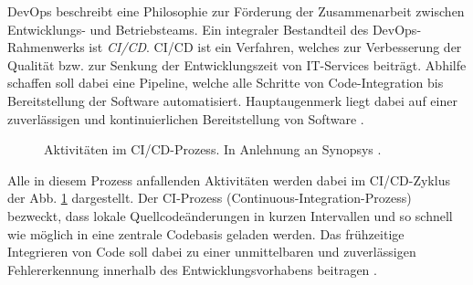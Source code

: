 DevOps beschreibt eine Philosophie zur Förderung der Zusammenarbeit zwischen Entwicklungs- und Betriebsteams. Ein integraler Bestandteil des DevOps-Rahmen\-werks ist \textit{\ac{CI/CD}}. CI/CD ist ein Verfahren, welches zur Verbesserung der Qualität bzw. zur Senkung der Entwicklungszeit von IT-Services beiträgt. Abhilfe schaffen soll dabei eine Pipeline, welche alle Schritte von Code-Integration bis Bereitstellung der Software automatisiert. Hauptaugenmerk liegt dabei auf einer zuverlässigen und kontinuierlichen Bereitstellung von Software \cite[471]{Zampetti.92720211012021}.
\begin{center}
	\begin{figure}[H]
		\centering
		\captionsetup{format=myformat}
		\caption[Aktivitäten im CI/CD-Prozess]{Aktivitäten im CI/CD-Prozess. In Anlehnung an Synopsys \cite{.20230201}.}
		\label{fig:CICD_Cycle}
	\end{figure}
\end{center}
\vspace*{-15mm}
Alle in diesem Prozess anfallenden Aktivitäten werden dabei im CI/CD-Zyklus der Abb. \ref*{fig:CICD_Cycle} dargestellt. Der \acs{CI}-Prozess (Continuous-Integration-Prozess) bezweckt, dass lokale Quellcode\-änderungen in kurzen Intervallen und so schnell wie möglich in eine zentrale Codebasis geladen werden. Das frühzeitige Integrieren von Code soll dabei zu einer unmittelbaren und zuverlässigen Fehlererkennung innerhalb des Entwicklungsvorhabens beitragen \cite[471]{Zampetti.92720211012021}. 
